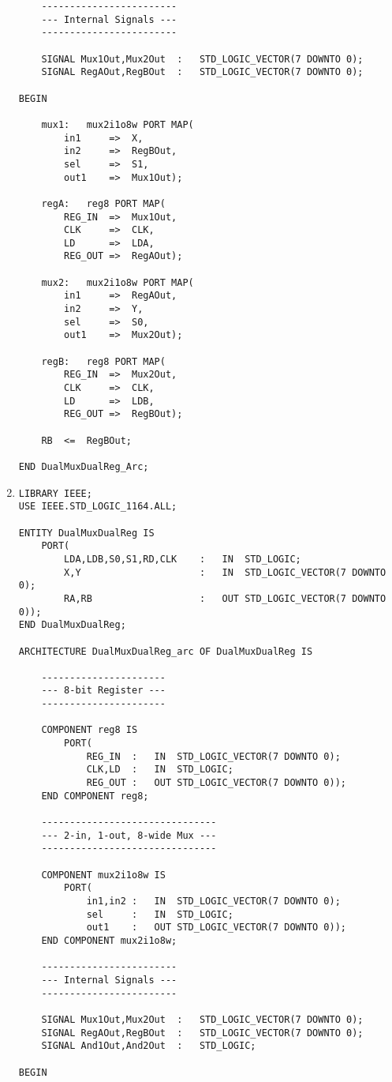 \begin{enumerate}
\begin{lstlisting}
	------------------------
	--- Internal Signals ---
	------------------------
		
	SIGNAL Mux1Out,Mux2Out	:	STD_LOGIC_VECTOR(7 DOWNTO 0);
	SIGNAL RegAOut,RegBOut	:	STD_LOGIC_VECTOR(7 DOWNTO 0);
	
BEGIN
	
	mux1:	mux2i1o8w PORT MAP(
		in1		=>	X,
		in2		=>	RegBOut,
		sel		=>	S1,
		out1	=>	Mux1Out);
		
	regA:	reg8 PORT MAP(
		REG_IN	=>	Mux1Out,
		CLK		=>	CLK,
		LD		=>	LDA,
		REG_OUT	=>	RegAOut);
		
	mux2:	mux2i1o8w PORT MAP(
		in1		=>	RegAOut,
		in2		=>	Y,
		sel		=>	S0,
		out1	=>	Mux2Out);
		
	regB:	reg8 PORT MAP(
		REG_IN	=>	Mux2Out,
		CLK		=>	CLK,
		LD		=>	LDB,
		REG_OUT	=>	RegBOut);
		
	RB	<=	RegBOut;
	
END DualMuxDualReg_Arc;
	\end{lstlisting}
	
	\item \begin{lstlisting}
LIBRARY IEEE;
USE IEEE.STD_LOGIC_1164.ALL;

ENTITY DualMuxDualReg IS
	PORT(
		LDA,LDB,S0,S1,RD,CLK	:	IN	STD_LOGIC;
		X,Y						:	IN	STD_LOGIC_VECTOR(7 DOWNTO 0);
		RA,RB					:	OUT	STD_LOGIC_VECTOR(7 DOWNTO 0));
END DualMuxDualReg;

ARCHITECTURE DualMuxDualReg_arc OF DualMuxDualReg IS
	
	----------------------
	--- 8-bit Register ---
	----------------------

	COMPONENT reg8 IS
		PORT(
			REG_IN	:	IN	STD_LOGIC_VECTOR(7 DOWNTO 0);
			CLK,LD	:	IN	STD_LOGIC;
			REG_OUT	:	OUT	STD_LOGIC_VECTOR(7 DOWNTO 0));
	END COMPONENT reg8;
	
	-------------------------------
	--- 2-in, 1-out, 8-wide Mux ---
	-------------------------------
	
	COMPONENT mux2i1o8w IS
		PORT(
			in1,in2	:	IN	STD_LOGIC_VECTOR(7 DOWNTO 0);
			sel		:	IN	STD_LOGIC;
			out1	:	OUT	STD_LOGIC_VECTOR(7 DOWNTO 0));
	END COMPONENT mux2i1o8w;
	
	------------------------
	--- Internal Signals ---
	------------------------
		
	SIGNAL Mux1Out,Mux2Out	:	STD_LOGIC_VECTOR(7 DOWNTO 0);
	SIGNAL RegAOut,RegBOut	:	STD_LOGIC_VECTOR(7 DOWNTO 0);
	SIGNAL And1Out,And2Out	:	STD_LOGIC;
	
BEGIN
	

\end{lstlisting}
\end{enumerate}
